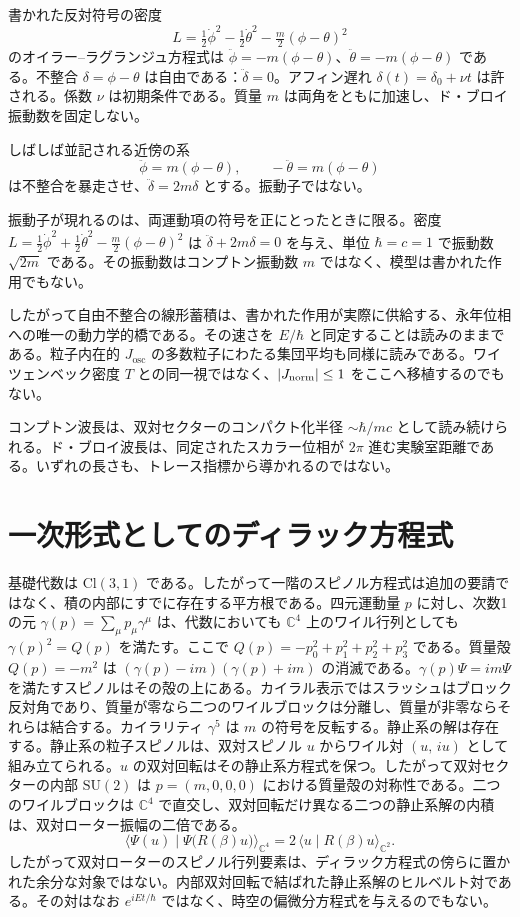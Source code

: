 \documentclass[a4paper]{article}
\begin{document}
書かれた反対符号の密度
\[
L=\tfrac12\dot\phi^2-\tfrac12\dot\theta^2-\tfrac m2(\phi-\theta)^2
\]
のオイラー–ラグランジュ方程式は \(\ddot\phi=-m(\phi-\theta)\)、\(\ddot\theta=-m(\phi-\theta)\) である。不整合 \(\delta=\phi-\theta\) は自由である：\(\ddot\delta=0\)。アフィン遅れ \(\delta(t)=\delta_0+\nu t\) は許される。係数 \(\nu\) は初期条件である。質量 \(m\) は両角をともに加速し、ド・ブロイ振動数を固定しない。

しばしば並記される近傍の系
\[
\ddot\phi=m(\phi-\theta),\qquad -\ddot\theta=m(\phi-\theta)
\]
は不整合を暴走させ、\(\ddot\delta=2m\delta\) とする。振動子ではない。

振動子が現れるのは、両運動項の符号を正にとったときに限る。密度 \(L=\tfrac12\dot\phi^2+\tfrac12\dot\theta^2-\tfrac m2(\phi-\theta)^2\) は \(\ddot\delta+2m\delta=0\) を与え、単位 \(\hbar=c=1\) で振動数 \(\sqrt{2m}\) である。その振動数はコンプトン振動数 \(m\) ではなく、模型は書かれた作用でもない。

したがって自由不整合の線形蓄積は、書かれた作用が実際に供給する、永年位相への唯一の動力学的橋である。その速さを \(E/\hbar\) と同定することは読みのままである。粒子内在的 \(J_{\mathrm{osc}}\) の多数粒子にわたる集団平均も同様に読みである。ワイツェンベック密度 \(T\) との同一視ではなく、\(\lvert J_{\rm norm}\rvert\le 1\) をここへ移植するのでもない。

コンプトン波長は、双対セクターのコンパクト化半径 \(\sim\hbar/mc\) として読み続けられる。ド・ブロイ波長は、同定されたスカラー位相が \(2\pi\) 進む実験室距離である。いずれの長さも、トレース指標から導かれるのではない。

\section{一次形式としてのディラック方程式}

基礎代数は \(\mathrm{Cl}(3,1)\) である。したがって一階のスピノル方程式は追加の要請ではなく、積の内部にすでに存在する平方根である。四元運動量 \(p\) に対し、次数1の元 \(\gamma(p)=\sum_{\mu}p_{\mu}\gamma^{\mu}\) は、代数においても \(\mathbb{C}^4\) 上のワイル行列としても \(\gamma(p)^2=Q(p)\) を満たす。ここで \(Q(p)=-p_0^2+p_1^2+p_2^2+p_3^2\) である。質量殻 \(Q(p)=-m^2\) は \((\gamma(p)-im)(\gamma(p)+im)\) の消滅である。\(\gamma(p)\Psi=im\Psi\) を満たすスピノルはその殻の上にある。カイラル表示ではスラッシュはブロック反対角であり、質量が零なら二つのワイルブロックは分離し、質量が非零ならそれらは結合する。カイラリティ \(\gamma^5\) は \(m\) の符号を反転する。静止系の解は存在する。静止系の粒子スピノルは、双対スピノル \(u\) からワイル対 \((u,\,iu)\) として組み立てられる。\(u\) の双対回転はその静止系方程式を保つ。したがって双対セクターの内部 \(\mathrm{SU}(2)\) は \(p=(m,0,0,0)\) における質量殻の対称性である。二つのワイルブロックは \(\mathbb{C}^4\) で直交し、双対回転だけ異なる二つの静止系解の内積は、双対ローター振幅の二倍である。
\[
\langle\Psi(u)\mid\Psi\bigl(R(\beta)u\bigr)\rangle_{\mathbb{C}^4}
  =2\,\langle u\mid R(\beta)u\rangle_{\mathbb{C}^2}.
\]
したがって双対ローターのスピノル行列要素は、ディラック方程式の傍らに置かれた余分な対象ではない。内部双対回転で結ばれた静止系解のヒルベルト対である。その対はなお \(e^{iEt/\hbar}\) ではなく、時空の偏微分方程式を与えるのでもない。
\end{document}
